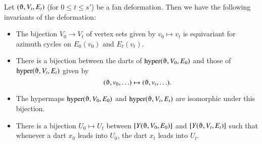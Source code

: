 \begin{lemma}  Let $(\orgn,V_t,E_t)$ (for $0\le t\le s'$) 
be a fan deformation. Then we have the following invariants
of the deformation:
\begin{itemize}
\item The bijection $V_0\to V_t$ of vertex sets
given by $v_0\mapsto v_t$ 
is equivariant for
azimuth cycles on $E_0(v_0)$ and $E_t(v_t)$.
\item There is a bijection between the darts of $\op{hyper}(\orgn,V_0,E_0)$
and those of $\op{hyper}(\orgn,V_t,E_t)$ given by
   $$(\orgn,v_0,\ldots) \mapsto (\orgn,v_t,\ldots).$$
\item The hypermaps $\op{hyper}(\orgn,V_0,E_0)$ and $\op{hyper}(\orgn,V_t,E_t)$
are isomorphic under this bijection.
\item There is a bijection $U_0\mapsto U_t$ 
between $\comp{Y(\orgn,V_0,E_0)}$
and $\comp{Y(\orgn,V_t,E_t)}$ such that whenever a
dart $x_0$ leads into
$U_0$, the dart $x_t$ leads into
$U_t$.
\end{itemize}
\end{lemma}

